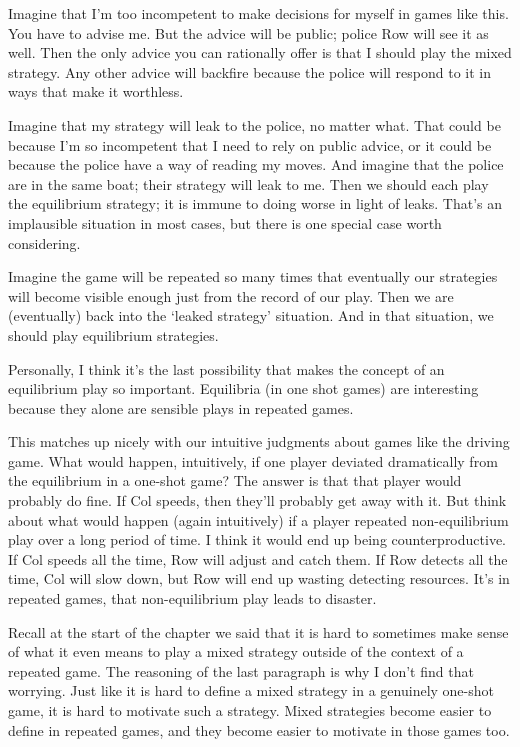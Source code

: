 \documentclass[openany]{book}
\begin{document}
\begin{enumerate*}
\item Imagine that I'm too incompetent to make decisions for myself in games like this. You have to advise me. But the advice will be public; police Row will see it as well. Then the only advice you can rationally offer is that I should play the mixed strategy. Any other advice will backfire because the police will respond to it in ways that make it worthless.
\item Imagine that my strategy will leak to the police, no matter what. That could be because I'm so incompetent that I need to rely on public advice, or it could be because the police have a way of reading my moves. And imagine that the police are in the same boat; their strategy will leak to me. Then we should each play the equilibrium strategy; it is immune to doing worse in light of leaks. That's an implausible situation in most cases, but there is one special case worth considering.
\item Imagine the game will be repeated so many times that eventually our strategies will become visible enough just from the record of our play. Then we are (eventually) back into the `leaked strategy' situation. And in that situation, we should play equilibrium strategies.
\end{enumerate*}
Personally, I think it's the last possibility that makes the concept of an equilibrium play so important. Equilibria (in one shot games) are interesting because they alone are sensible plays in repeated games.

This matches up nicely with our intuitive judgments about games like the driving game. What would happen, intuitively, if one player deviated dramatically from the equilibrium in a one-shot game? The answer is that that player would probably do fine. If Col speeds, then they'll probably get away with it. But think about what would happen (again intuitively) if a player repeated non-equilibrium play over a long period of time. I think it would end up being counterproductive. If Col speeds all the time, Row will adjust and catch them. If Row detects all the time, Col will slow down, but Row will end up wasting detecting resources. It's in repeated games, that non-equilibrium play leads to disaster.

Recall at the start of the chapter we said that it is hard to sometimes make sense of what it even means to play a mixed strategy outside of the context of a repeated game. The reasoning of the last paragraph is why I don't find that worrying. Just like it is hard to define a mixed strategy in a genuinely one-shot game, it is hard to motivate such a strategy. Mixed strategies become easier to define in repeated games, and they become easier to motivate in those games too.
\end{document}
